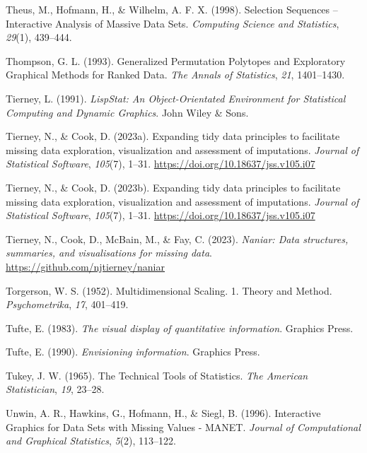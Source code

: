 \documentclass[
  letterpaper,
]{krantz}
\newlength{\cslhangindent}
\newenvironment{CSLReferences}[2] %
 {\begin{list}{}{%
  \setlength{\itemindent}{0pt}
  \setlength{\leftmargin}{0pt}
  \setlength{\parsep}{0pt}
  \ifodd #1
   \setlength{\leftmargin}{\cslhangindent}
   \setlength{\itemindent}{-1\cslhangindent}
  \fi
  \setlength{\itemsep}{#2\baselineskip}}}
 {\end{list}}
\begin{document}
\begin{CSLReferences}{1}{0}
Theus, M., Hofmann, H., \& Wilhelm, A. F. X. (1998). Selection
{S}equences -- {I}nteractive {A}nalysis of {M}assive {D}ata {S}ets.
\emph{Computing Science and Statistics}, \emph{29}(1), 439--444.

Thompson, G. L. (1993). Generalized {P}ermutation {P}olytopes and
{E}xploratory {G}raphical {M}ethods for {R}anked {D}ata. \emph{The
Annals of Statistics}, \emph{21}, 1401--1430.

Tierney, L. (1991). \emph{{L}isp{S}tat: {A}n {O}bject-{O}rientated
{E}nvironment for {S}tatistical {C}omputing and {D}ynamic {G}raphics}.
John Wiley \& Sons.

Tierney, N., \& Cook, D. (2023a). Expanding tidy data principles to
facilitate missing data exploration, visualization and assessment of
imputations. \emph{Journal of Statistical Software}, \emph{105}(7),
1--31. \url{https://doi.org/10.18637/jss.v105.i07}

Tierney, N., \& Cook, D. (2023b). Expanding tidy data principles to
facilitate missing data exploration, visualization and assessment of
imputations. \emph{Journal of Statistical Software}, \emph{105}(7),
1--31. \url{https://doi.org/10.18637/jss.v105.i07}

Tierney, N., Cook, D., McBain, M., \& Fay, C. (2023). \emph{Naniar: Data
structures, summaries, and visualisations for missing data}.
\url{https://github.com/njtierney/naniar}

Torgerson, W. S. (1952). Multidimensional {S}caling. 1. {T}heory and
{M}ethod. \emph{Psychometrika}, \emph{17}, 401--419.

Tufte, E. (1983). \emph{The visual display of quantitative information}.
Graphics Press.

Tufte, E. (1990). \emph{Envisioning information}. Graphics Press.

Tukey, J. W. (1965). The {T}echnical {T}ools of {S}tatistics. \emph{The
American Statistician}, \emph{19}, 23--28.

Unwin, A. R., Hawkins, G., Hofmann, H., \& Siegl, B. (1996).
{I}nteractive {G}raphics for {D}ata {S}ets with {M}issing {V}alues -
{MANET}. \emph{Journal of Computational and Graphical Statistics},
\emph{5}(2), 113--122.


\end{CSLReferences}
\end{document}
